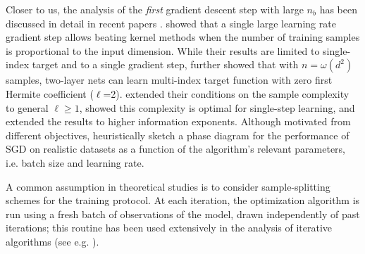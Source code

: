 Closer to us, the analysis of the {\it first} gradient descent step with large $n_b$ has been discussed in detail in recent papers \citep{ba2022high,damian2022neural,dandi2023how}. \cite{ba2022high} showed that a single large learning rate gradient step allows beating kernel methods when the number of training samples is proportional to the input dimension. While their results are limited to single-index target and to a single gradient step, \cite{damian2022neural} further showed that with $n = \omega(d^2)$ samples, two-layer nets can learn multi-index target function with zero first Hermite coefficient ($\ell$=2). \cite{dandi2023how} extended their conditions on the sample complexity to general $\ell\geq 1$, showed this complexity is optimal for single-step learning, and extended the results to higher information exponents. Although motivated from different objectives,  \cite{sclocchi2024different} heuristically sketch a phase diagram for the performance of SGD on realistic datasets as a function of the algorithm's relevant parameters, i.e. batch size and learning rate. 


A common assumption in  theoretical studies is to consider
sample-splitting schemes for the training protocol.  At each iteration, the optimization algorithm is run using a fresh batch of observations of the model, drawn independently of past iterations; this routine has been used extensively in the analysis of iterative algorithms (see e.g. \citep{chandrasekher2021sharp,jain2013low,hardt2014fast,jain2015fast,kwon2019global}).
